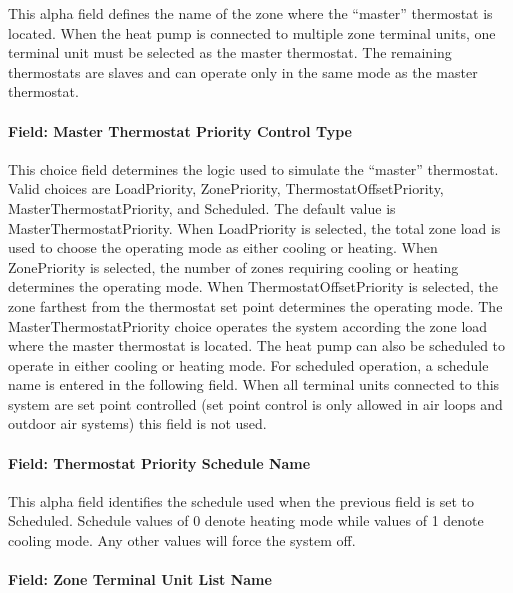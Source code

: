 This alpha field defines the name of the zone where the ``master'' thermostat is located. When the heat pump is connected to multiple zone terminal units, one terminal unit must be selected as the master thermostat. The remaining thermostats are slaves and can operate only in the same mode as the master thermostat.

\paragraph{Field: Master Thermostat Priority Control Type}\label{field-master-thermostat-priority-control-type-000}

This choice field determines the logic used to simulate the ``master'' thermostat. Valid choices are LoadPriority, ZonePriority, ThermostatOffsetPriority, MasterThermostatPriority, and Scheduled. The default value is MasterThermostatPriority. When LoadPriority is selected, the total zone load is used to choose the operating mode as either cooling or heating. When ZonePriority is selected, the number of zones requiring cooling or heating determines the operating mode. When ThermostatOffsetPriority is selected, the zone farthest from the thermostat set point determines the operating mode. The MasterThermostatPriority choice operates the system according the zone load where the master thermostat is located. The heat pump can also be scheduled to operate in either cooling or heating mode. For scheduled operation, a schedule name is entered in the following field. When all terminal units connected to this system are set point controlled (set point control is only allowed in air loops and outdoor air systems) this field is not used.

\paragraph{Field: Thermostat Priority Schedule Name}\label{field-thermostat-priority-schedule-name-000}

This alpha field identifies the schedule used when the previous field is set to Scheduled. Schedule values of 0 denote heating mode while values of 1 denote cooling mode. Any other values will force the system off.

\paragraph{Field: Zone Terminal Unit List Name}\label{field-zone-terminal-unit-list-name}

